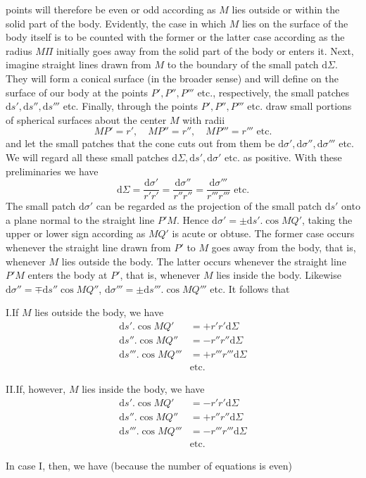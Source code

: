 points will therefore be even or odd according as $M$ lies outside or within the solid part of the body. Evidently, the case in which $M$ lies on the surface of the body itself is to be counted with the former or the latter case according as the radius $M\Pi$ initially goes away from the solid part of the body or enters it. Next, imagine straight lines drawn from $M$ to the boundary of the small patch $\mathrm{d}\Sigma$. They will form a conical surface (in the broader sense) and will define on the surface of our body at the points $P',P'',P'''$ etc., respectively, the small patches $\mathrm{d}s',\mathrm{d}s'',\mathrm{d}s'''$ etc. Finally, through the points $P',P'',P'''$ etc. draw small portions of spherical surfaces about the center $M$ with radii
\[
MP'=r',\quad MP''=r'',\quad MP'''=r'''\text{ etc.}
\]
and let the small patches that the cone cuts out from them be $\mathrm{d}\sigma',\mathrm{d}\sigma'',\mathrm{d}\sigma'''$ etc. We will regard all these small patches $\mathrm{d}\Sigma,\mathrm{d}s',\mathrm{d}\sigma'$ etc. as positive. With these preliminaries we have
\[
\mathrm{d}\Sigma=\frac{\mathrm{d}\sigma'}{r'r'}=\frac{\mathrm{d}\sigma''}{r''r''}=\frac{\mathrm{d}\sigma'''}{r'''r'''}\text{ etc.}
\]
The small patch $\mathrm{d}\sigma'$ can be regarded as the projection of the small patch $\mathrm{d}s'$ onto a plane normal to the straight line $P'M$. Hence $\mathrm{d}\sigma'=\pm\mathrm{d}s'.\cos MQ'$, taking the upper or lower sign according as $MQ'$ is acute or obtuse. The former case occurs whenever the straight line drawn from $P'$ to $M$ goes away from the body, that is, whenever $M$ lies outside the body. The latter occurs whenever the straight line $P'M$ enters the body at $P'$, that is, whenever $M$ lies inside the body. Likewise $\mathrm{d}\sigma''=\mp\mathrm{d}s''\cos MQ''$, $\mathrm{d}\sigma'''=\pm\mathrm{d}s'''.\cos MQ'''$ etc. It follows that
\par
I.\quad If $M$ lies outside the body, we have
\[
\begin{aligned}
\mathrm{d}s'.\cos MQ'&=+r'r'\mathrm{d}\Sigma\\
\mathrm{d}s''.\cos MQ''&=-r''r''\mathrm{d}\Sigma\\
\mathrm{d}s'''.\cos MQ'''&=+r'''r'''\mathrm{d}\Sigma\\
&\text{etc.}
\end{aligned}
\]
\par
II.\quad If, however, $M$ lies inside the body, we have
\[
\begin{aligned}
\mathrm{d}s'.\cos MQ'&=-r'r'\mathrm{d}\Sigma\\
\mathrm{d}s''.\cos MQ''&=+r''r''\mathrm{d}\Sigma\\
\mathrm{d}s'''.\cos MQ'''&=-r'''r'''\mathrm{d}\Sigma\\
&\text{etc.}
\end{aligned}
\]
\par
In case I, then, we have (because the number of equations is even)
